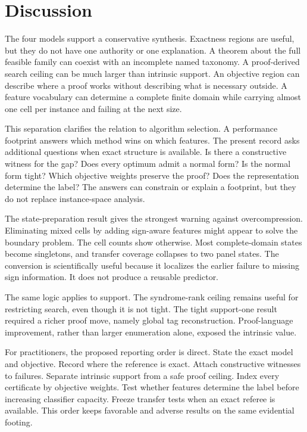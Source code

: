 \section{Discussion}

The four models support a conservative synthesis.  Exactness regions are useful, but they do not have one authority or one explanation.  A theorem about the full feasible family can coexist with an incomplete named taxonomy.  A proof-derived search ceiling can be much larger than intrinsic support.  An objective region can describe where a proof works without describing what is necessary outside.  A feature vocabulary can determine a complete finite domain while carrying almost one cell per instance and failing at the next size.

This separation clarifies the relation to algorithm selection.  A performance footprint answers which method wins on which features.  The present record asks additional questions when exact structure is available.  Is there a constructive witness for the gap?  Does every optimum admit a normal form?  Is the normal form tight?  Which objective weights preserve the proof?  Does the representation determine the label?  The answers can constrain or explain a footprint, but they do not replace instance-space analysis.

The state-preparation result gives the strongest warning against overcompression.  Eliminating mixed cells by adding sign-aware features might appear to solve the boundary problem.  The cell counts show otherwise.  Most complete-domain states become singletons, and transfer coverage collapses to two panel states.  The conversion is scientifically useful because it localizes the earlier failure to missing sign information.  It does not produce a reusable predictor.

The same logic applies to support.  The syndrome-rank ceiling remains useful for restricting search, even though it is not tight.  The tight support-one result required a richer proof move, namely global tag reconstruction.  Proof-language improvement, rather than larger enumeration alone, exposed the intrinsic value.

For practitioners, the proposed reporting order is direct.  State the exact model and objective.  Record where the reference is exact.  Attach constructive witnesses to failures.  Separate intrinsic support from a safe proof ceiling.  Index every certificate by objective weights.  Test whether features determine the label before increasing classifier capacity.  Freeze transfer tests when an exact referee is available.  This order keeps favorable and adverse results on the same evidential footing.
